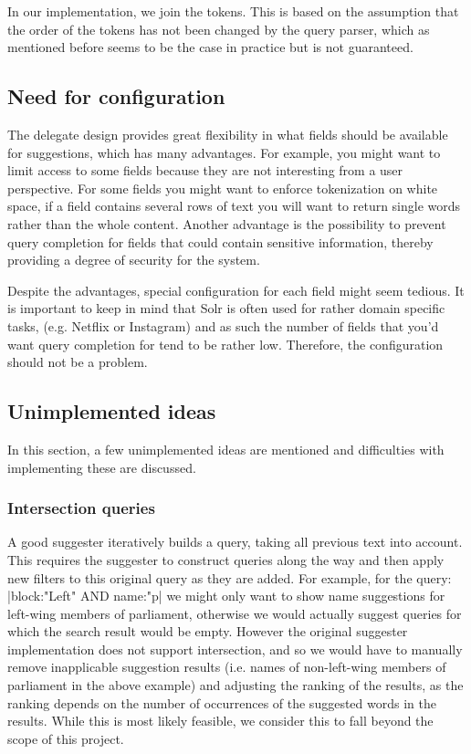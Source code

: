 In our implementation, we join the tokens. This is based on the assumption that the order of the tokens has not been changed by the query parser, which as mentioned before seems to be the case in practice but is not guaranteed. 


\subsection{Need for configuration}

The delegate design provides great flexibility in what fields should be available for suggestions, which has many advantages. For example, you might want to limit access to some fields because they are not interesting from a user perspective. For some fields you might want to enforce tokenization on white space, if a field contains several rows of text you will want to return single words rather than the whole content.  Another advantage is the possibility to prevent query completion for fields that could contain sensitive information, thereby providing a degree of security for the system.

Despite the advantages, special configuration for each field might seem tedious. It is important to keep in mind that Solr is often used for rather domain specific tasks, (e.g. Netflix or Instagram) and as such the number of fields that you’d want query completion for tend to be rather low. Therefore, the configuration should not be a problem.

\subsection{Unimplemented ideas}

In this section, a few unimplemented ideas are mentioned and difficulties with implementing these are discussed. 

\subsubsection{Intersection queries}

A good suggester iteratively builds a query, taking all previous text into account. This requires the suggester to construct queries along the way and then apply new filters to this original query as they are added. For example, for the query: |block:"Left" AND name:"p| we might only want to show name suggestions for left-wing members of parliament, otherwise we would actually suggest queries for which the search result would be empty.
However the original suggester implementation does not support intersection, and so we would have to manually remove inapplicable suggestion results (i.e. names of non-left-wing members of parliament in the above example) and adjusting the ranking of the results, as the ranking depends on the number of occurrences of the suggested words in the results. While this is most likely feasible, we consider this to fall beyond the scope of this project.

